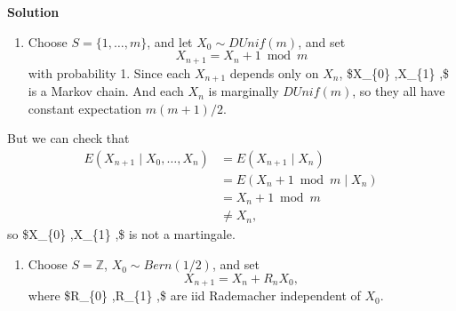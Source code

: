 \documentclass[
  letterpaper,
  DIV=11,
  numbers=noendperiod]{scrreprt}
\providecommand{\tightlist}{%
  \setlength{\itemsep}{0pt}\setlength{\parskip}{0pt}}\usepackage{longtable,booktabs,array}
\theoremstyle{definition}
\theoremstyle{plain}
\theoremstyle{remark}
\begin{document}
\begin{tcolorbox}[enhanced jigsaw, bottomrule=.15mm, opacityback=0, arc=.35mm, breakable, left=2mm, colframe=quarto-callout-tip-color-frame, toprule=.15mm, rightrule=.15mm, leftrule=.75mm, colback=white]
\begin{minipage}[t]{5.5mm}
\textcolor{quarto-callout-tip-color}{\faLightbulb}
\end{minipage}%
\begin{minipage}[t]{\textwidth - 5.5mm}

\textbf{Solution}\vspace{2mm}

\begin{enumerate}
\def\labelenumi{(\alph{enumi})}
\tightlist
\item
  Choose \(\displaystyle S=\{1,\dotsc ,m\}\), and let
  \(\displaystyle X_{0} \sim DUnif( m)\), and set \[
  \begin{equation*}
  X_{n+1} =X_{n} +1\bmod m
  \end{equation*}
  \] with probability 1. Since each \(\displaystyle X_{n+1}\) depends
  only on \(\displaystyle X_{n}\), \$\displaystyle X\_\{0\} ,X\_\{1\}
  ,\dotsc \$ is a Markov chain. And each \(\displaystyle X_{n}\) is
  marginally \(\displaystyle DUnif( m)\), so they all have constant
  expectation \(\displaystyle m( m+1) /2\).
\end{enumerate}

But we can check that \[
\begin{align*}
E( X_{n+1} \mid X_{0} ,\dotsc ,X_{n}) & =E( X_{n+1} \mid X_{n})\\
 & =E( X_{n} +1\bmod m\mid X_{n})\\
 & =X_{n} +1\bmod m\\
 & \neq X_{n} ,
\end{align*}
\] so \$\displaystyle X\_\{0\} ,X\_\{1\} ,\dotsc \$ is not a martingale.

\begin{enumerate}
\def\labelenumi{(\alph{enumi})}
\setcounter{enumi}{1}
\tightlist
\item
  Choose \(\displaystyle S=\mathbb{Z}\),
  \(\displaystyle X_{0} \sim Bern( 1/2)\), and set \[
  \begin{equation*}
  X_{n+1} =X_{n} +R_{n} X_{0} ,
  \end{equation*}
  \] where \$\displaystyle R\_\{0\} ,R\_\{1\} ,\dotsc \$ are iid
  Rademacher independent of \(\displaystyle X_{0}\).
\end{enumerate}


\end{minipage}
\end{tcolorbox}
\end{document}
